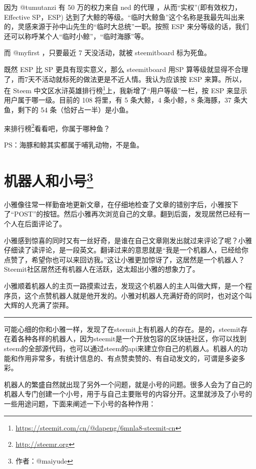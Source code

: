 \documentclass[]{ctexbook}
\renewcommand{\href}[2]{#2\footnote{\url{#1}}}
\begin{document}
因为 @tumutanzi 有 50 万的权力来自 ned 的代理 ，从而``实权''(即有效权力，Effective SP，ESP) 达到了大鲸的等级。``临时大鲸鱼''这个名称是我最先叫出来的，灵感来源于孙中山先生的``临时大总统''一职。按照 ESP 来分等级的话，我们还可以称呼某个人``临时小鲸''，``临时海豚''等。

而 @myfirst ，只要最近 7 天没活动，就被 steemitboard 标为死鱼。

既然 ESP 比 SP 更具有现实意义，那么 steemitboard 用SP 算等级就显得不合理了，而7天不活动就标死的做法更是不近人情。我认为应该按 ESP 来算。所以，在 Steem \href{https://steemit.com/cn/@dapeng/6mnla8-steemit-cn}{中文区水浒英雄排行榜}上，我新增了``用户等级''一栏，按 ESP 来显示用户属于哪一级。目前的 108 将里，有 5 条大鲸，4 条小鲸，8 条海豚，37 条大鱼，剩下的 54 条（恰好占一半）是小鱼。

来\href{http://steemr.org}{排行榜}看看吧，你属于哪种鱼？

PS：海豚和鲸其实都属于哺乳动物，不是鱼。

\section[机器人和小号]{\texorpdfstring{机器人和小号\footnote{作者：@maiyude}}{机器人和小号}}

小雅像往常一样勤奋地更新文章，在仔细地检查了文章的错别字后，小雅按下了``POST''的按钮。然后小雅再次浏览自己的文章。翻到后面，发现居然已经有一个人在后面评论了。

小雅感到惊喜的同时又有一丝好奇，是谁在自己文章刚发出就过来评论了呢？小雅仔细读了读评论，是一段英文。翻译过来的意思就是``我是一个机器人，已经给你点赞了，希望你也可以来回访我。''这让小雅更加惊讶了，这居然是一个机器人？Steemit社区居然还有机器人在活跃，这太超出小雅的想象力了。

小雅顺着机器人的主页一路摸索过去，发现这个机器人的主人叫做大辉，是一个程序员，这个点赞机器人就是他开发的。小雅对机器人充满好奇的同时，也对这个叫大辉的人充满了崇拜。

\begin{center}\rule{0.5\linewidth}{\linethickness}\end{center}

可能心细的你和小雅一样，发现了在steemit上有机器人的存在。是的，steemit存在着各种各样的机器人，因为steemit是一个开放包容的区块链社区，你可以找到steem的全部源代码，也可以通过steem的api来建立你自己的机器人。机器人的功能和作用非常多，有统计信息的、有点赞卖赞的、有自动发文的，可谓是多姿多彩。

机器人的繁盛自然就出现了另外一个问题，就是小号的问题。很多人会为了自己的机器人专门创建一个小号，用于与自己主要账号的内容分开。这里就涉及了小号的一些用途问题，下面来阐述一下小号的各种作用：
\end{document}
